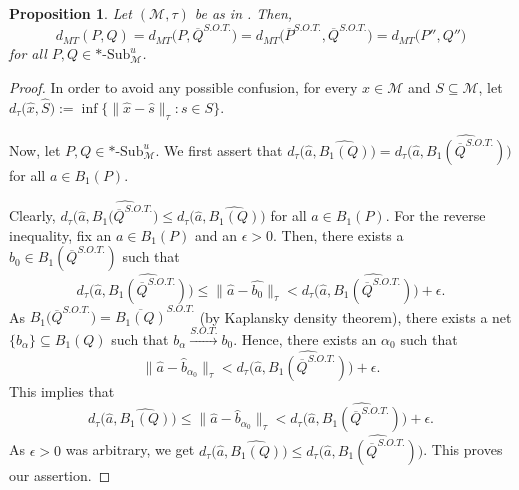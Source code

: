 \documentclass{amsart}
\numberwithin{equation}{section}
\newcommand{\1}{\mathbf{1}}
\newcommand{\mM}{\mathcal{M}}
\newtheorem{proposition}[theorem]{Proposition}
\begin{document}
\begin{proposition}\label{dMT-SOT}
Let $(\mM, \tau)$ be as in . Then, 
\[
d_{MT}(P,Q) = d_{MT}\Big(P, \overline{Q}^{S.O.T.}\Big) =
d_{MT}\Big(\overline{P}^{S.O.T.}, \overline{Q}^{S.O.T.}\Big) = d_{MT}\Big(P'',
Q''\Big)
\] 
for all $P, Q \in *\text{-}\mathrm{Sub}^u_{\mM}$.
\end{proposition}
\begin{proof}
In order to avoid any possible confusion, for every $x \in \mM$ and $S
\subseteq \mM$, let $d_\tau\big(\widehat{x}, \widehat{S}\big):=\inf \{ \|\widehat{x} -
\widehat{s}\|_\tau : s \in S\}$.

Now, let $P, Q \in *\text{-Sub}^u_{\mM}$.  We first assert that
$d_\tau\Big(\widehat{a}, \widehat{B_1(Q)}\Big) = d_\tau\Big(\widehat{a},
\widehat{B_1(\overline{Q}^{S.O.T.})}\Big)$ for all $a \in B_1(P)$.

Clearly, $d_\tau\Big(\widehat{a}, \widehat{ B_1(\overline{Q}^{S.O.T.}\Big)}\leq
d_\tau\Big(\widehat{a}, \widehat{B_1(Q)}\Big)$ for all $a\in B_1(P)$. For the
reverse inequality, fix an $a \in B_1(P)$ and an $\epsilon>0$. Then,
there exists a $b_{0}\in B_1(\overline{Q}^{S.O.T.})$ such that
\[
d_\tau\Big(\widehat{a},
\widehat{B_1(\overline{Q}^{S.O.T.})}\Big) \leq
\|\widehat{a}-\widehat{b_{0}}\|_{\tau}< d_\tau\Big(\widehat{a},
\widehat{B_1(\overline{Q}^{S.O.T.})}\Big)+ \epsilon.
\]
As $ B_1\Big(\overline{Q}^{S.O.T.}\Big)= \overline{B_1(Q)}^{S.O.T.}$ (by
Kaplansky density theorem), there exists a net
$\{b_{\alpha}\}\subseteq B_1(Q)$ such that
$b_{\alpha}\stackrel{S.O.T.}{\longrightarrow} b_{0}$. Hence, there
exists an $\alpha_{0}$ such that
\[
\|\widehat{a}-\widehat{b}_{\alpha_{0}}\|_{\tau}< d_\tau \Big(\widehat{a},
\widehat{B_1(\overline{Q}^{S.O.T.})}\Big) + \epsilon.
\]
This implies that
\[
d_\tau\big(\widehat{a}, \widehat{B_1(Q)}\big)\leq
\|\widehat{a}-\widehat{b}_{\alpha_{0}}\|_{\tau} <d_\tau \Big(\widehat{a},
\widehat{B_1(\overline{Q}^{S.O.T.})}\Big)+ \epsilon.
\]
As $\epsilon>0$ was arbitrary, we get $d_\tau\Big(\widehat{a},
\widehat{B_1(Q)}\Big)\leq d_\tau\Big(\widehat{a},
\widehat{B_1(\overline{Q}^{S.O.T.})}\Big)$. This proves our assertion.


\end{proof}
\end{document}
